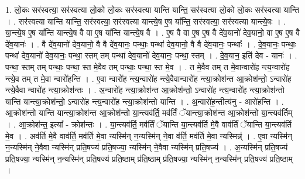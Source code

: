 \documentclass[17pt]{extarticle}
\begin{document}
1. लो॒कः सर॑स्वत्या॒ सर॑स्वत्या लो॒को लो॒कः सर॑स्वत्या यान्ति यान्ति॒ सर॑स्वत्या लो॒को लो॒कः सर॑स्वत्या यान्ति । . सर॑स्वत्या यान्ति यान्ति॒ सर॑स्वत्या॒ सर॑स्वत्या यान्त्ये॒ष ए॒ष या᳚न्ति॒ सर॑स्वत्या॒ सर॑स्वत्या यान्त्ये॒षः । . या॒न्त्ये॒ष ए॒ष या᳚न्ति यान्त्ये॒ष वै वा ए॒ष या᳚न्ति यान्त्ये॒ष वै । . ए॒ष वै वा ए॒ष ए॒ष वै दे॑व॒यानो॑ देव॒यानो॒ वा ए॒ष ए॒ष वै दे॑व॒यानः॑ । . वै दे॑व॒यानो॑ देव॒यानो॒ वै वै दे॑व॒यानः॒ पन्थाः॒ पन्था॑ देव॒यानो॒ वै वै दे॑व॒यानः॒ पन्थाः᳚ । . दे॒व॒यानः॒ पन्थाः॒ पन्था॑ देव॒यानो॑ देव॒यानः॒ पन्था॒ स्तम् तम् पन्था॑ देव॒यानो॑ देव॒यानः॒ पन्था॒ स्तम् । . दे॒व॒यान॒ इति॑ देव - यानः॑ । . पन्था॒ स्तम् तम् पन्थाः॒ पन्था॒ स्त मे॒वैव तम् पन्थाः॒ पन्था॒ स्त मे॒व । . त मे॒वैव तम् त मे॒वान्वारो॑ह न्त्य॒न्वारो॑ह न्त्ये॒व तम् त मे॒वा न्वारो॑हन्ति । . ए॒वा न्वारो॑ह न्त्य॒न्वारो॑ह न्त्ये॒वैवान्वारो॑ह न्त्या॒क्रोश॑न्त आ॒क्रोश॑न्तो॒ ऽन्वारो॑ह न्त्ये॒वैवा न्वारो॑ह न्त्या॒क्रोश॑न्तः । . अ॒न्वारो॑ह न्त्या॒क्रोश॑न्त आ॒क्रोश॑न्तो॒ ऽन्वारो॑ह न्त्य॒न्वारो॑ह न्त्या॒क्रोश॑न्तो यान्ति यान्त्या॒क्रोश॑न्तो॒ ऽन्वारो॑ह न्त्य॒न्वारो॑ह न्त्या॒क्रोश॑न्तो यान्ति । . अ॒न्वारो॑ह॒न्तीत्य॑नु - आरो॑हन्ति । . आ॒क्रोश॑न्तो यान्ति यान्त्या॒क्रोश॑न्त आ॒क्रोश॑न्तो या॒न्त्यव॑र्ति॒ मव॑र्तिं ॅयान्त्या॒क्रोश॑न्त आ॒क्रोश॑न्तो या॒न्त्यव॑र्तिम् । . आ॒क्रोश॑न्त॒ इत्या᳚ - क्रोश॑न्तः । . या॒न्त्यव॑र्ति॒ मव॑र्तिं ॅयान्ति या॒न्त्यव॑र्ति मे॒वै वाव॑र्तिं ॅयान्ति या॒न्त्यव॑र्ति मे॒व । . अव॑र्ति मे॒वै वाव॑र्ति॒ मव॑र्ति मे॒वा न्यस्मि॑न् न॒न्यस्मि॑न् ने॒वा व॑र्ति॒ मव॑र्ति मे॒वा न्यस्मिन्न्॑ । . ए॒वा न्यस्मि॑न् न॒न्यस्मि॑न् ने॒वैवा न्यस्मि॑न् प्रति॒षज्य॑ प्रति॒षज्या॒ न्यस्मि॑न् ने॒वैवा न्यस्मि॑न् प्रति॒षज्य॑ । . अ॒न्यस्मि॑न् प्रति॒षज्य॑ प्रति॒षज्या॒ न्यस्मि॑न् न॒न्यस्मि॑न् प्रति॒षज्य॑ प्रति॒ष्ठाम् प्र॑ति॒ष्ठाम् प्र॑ति॒षज्या॒ न्यस्मि॑न् न॒न्यस्मि॑न् प्रति॒षज्य॑ प्रति॒ष्ठाम् । \newline
\end{document}
